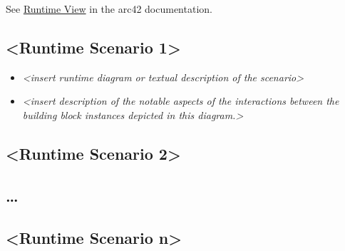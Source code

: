 See \href{https://docs.arc42.org/section-6/}{Runtime View} in the arc42
documentation.

\hypertarget{__runtime_scenario_1}{%
\subsection{\textless Runtime Scenario
1\textgreater{}}\label{__runtime_scenario_1}}

\begin{itemize}
\item
  \emph{\textless insert runtime diagram or textual description of the
  scenario\textgreater{}}
\item
  \emph{\textless insert description of the notable aspects of the
  interactions between the building block instances depicted in this
  diagram.\textgreater{}}
\end{itemize}

\hypertarget{__runtime_scenario_2}{%
\subsection{\textless Runtime Scenario
2\textgreater{}}\label{__runtime_scenario_2}}

\hypertarget{_}{%
\subsection{\ldots{}}\label{_}}

\hypertarget{__runtime_scenario_n}{%
\subsection{\textless Runtime Scenario
n\textgreater{}}\label{__runtime_scenario_n}}
